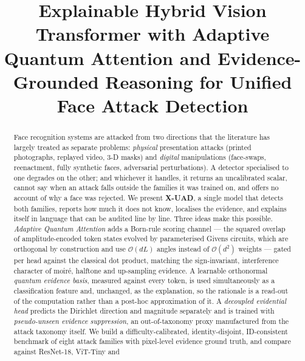 \documentclass[conference]{IEEEtran}
\begin{document}
\title{Explainable Hybrid Vision Transformer with Adaptive Quantum Attention and
Evidence-Grounded Reasoning for Unified Face Attack Detection}

\author{
}

\maketitle

\begin{abstract}
Face recognition systems are attacked from two directions that the literature has
largely treated as separate problems: \emph{physical} presentation attacks
(printed photographs, replayed video, 3-D masks) and \emph{digital} manipulations
(face-swaps, reenactment, fully synthetic faces, adversarial perturbations). A
detector specialised to one degrades on the other; and whichever it handles, it
returns an uncalibrated scalar, cannot say when an attack falls outside the
families it was trained on, and offers no account of why a face was rejected. We
present \textbf{X-UAD}, a single model that detects both families, reports how much
it does not know, localises the evidence, and explains itself in language that can
be audited line by line. Three ideas make this possible. \emph{Adaptive Quantum
Attention} adds a Born-rule scoring channel --- the squared overlap of
amplitude-encoded token states evolved by parameterised Givens circuits, which are
orthogonal by construction and use $\mathcal{O}(dL)$ angles instead of
$\mathcal{O}(d^{2})$ weights --- gated per head against the classical dot product,
matching the sign-invariant, interference character of moir\'e, halftone and
up-sampling evidence. A learnable orthonormal \emph{quantum evidence basis},
measured against every token, is used simultaneously as a classification feature
and, unchanged, as the explanation, so the rationale is a read-out of the
computation rather than a post-hoc approximation of it. A \emph{decoupled
evidential head} predicts the Dirichlet direction and magnitude separately and is
trained with \emph{pseudo-unseen evidence suppression}, an out-of-taxonomy proxy
manufactured from the attack taxonomy itself. We build a difficulty-calibrated,
identity-disjoint, ID-consistent benchmark of eight attack families with
pixel-level evidence ground truth, and compare against ResNet-18, ViT-Tiny and

\end{abstract}
\end{document}
